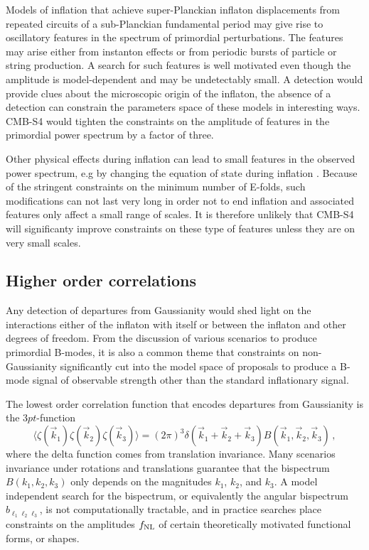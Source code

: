 Models of inflation that achieve super-Planckian inflaton displacements from repeated circuits of a sub-Planckian fundamental period may give rise to oscillatory features in the spectrum of primordial perturbations. The features may arise either from instanton effects or from periodic bursts of particle or string production. A search for such features is well motivated even though the amplitude is model-dependent and may be undetectably small. A detection would provide clues about the microscopic origin of the inflaton, the absence of a detection can constrain the parameters space of these models in interesting ways. CMB-S4 would tighten the constraints on the amplitude of features in the primordial power spectrum by a factor of three. 

Other physical effects during inflation can lead to small features in the observed power spectrum, e.g by changing the equation of state during inflation \cite{}. Because of the stringent constraints on the minimum number of E-folds, such modifications can not last very long in order not to end inflation and associated features only affect a small range of scales. It is therefore unlikely that CMB-S4 will significanty improve constraints on these type of features unless they are on very small scales. 
 
\subsection{Higher order correlations}
Any detection of departures from Gaussianity would shed light on the interactions either of the inflaton with itself or between the inflaton and other degrees of freedom. From the discussion of various scenarios to produce primordial B-modes, it is also a common theme that constraints on non-Gaussianity significantly cut into the model space of proposals to produce a B-mode signal of observable strength other than the standard inflationary signal. 

The lowest order correlation function that encodes departures from Gaussianity is the $3pt$-function
\begin{equation}
\langle\zeta(\vec{k}_1)\zeta(\vec{k}_2)\zeta(\vec{k}_3)\rangle=(2\pi)^3\delta(\vec{k}_1+\vec{k}_2+\vec{k}_3)B(\vec{k}_1,\vec{k}_2,\vec{k}_3)\,,
\end{equation}
where the delta function comes from translation invariance. Many scenarios invariance under rotations and translations guarantee that the bispectrum $B(k_1,k_2,k_3)$ only depends on the magnitudes $k_1$, $k_2$, and $k_3$. A model independent search for the bispectrum, or equivalently the angular bispectrum $b_{\ell_1\ell_2\ell_3}$, is not computationally tractable, and in practice searches place constraints on the amplitudes $f_{\rm NL}$ of certain theoretically motivated functional forms, or shapes.


